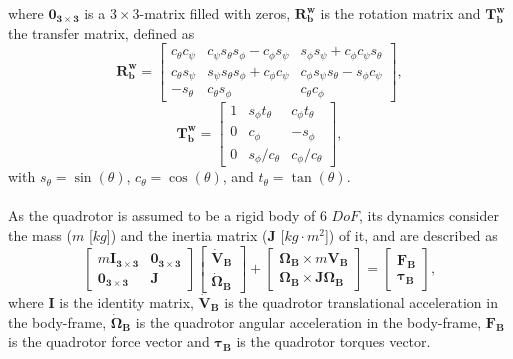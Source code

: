 where $\mathbf{0_{3\times 3}}$ is a $3\times 3$-matrix filled with zeros, $\mathbf{R_{b}^{w}}$ is the rotation matrix and $\mathbf{T_{b}^{w}}$ the transfer matrix, defined as
\begin{equation}
\mathbf{R_{b}^{w}} = \begin{bmatrix}
c_\theta c_\psi & c_\psi s_\theta s_\phi-c_\phi s_\psi & s_\phi s_\psi+c_\phi c_\psi s_\theta\\
c_\theta s_\psi & s_\psi s_\theta s_\phi+c_\phi c_\psi & c_\phi s_\psi s_\theta - s_\phi c_\psi\\
-s_\theta & c_\theta s_\phi & c_\theta c_\phi
\end{bmatrix},
\end{equation}
\begin{equation}
\mathbf{T_{b}^{w}} = \begin{bmatrix}
1 & s_\phi t_\theta & c_\phi t_\theta\\
0 & c_\phi & -s_\phi\\
0 & s_\phi / c_\theta & c_\phi / c_\theta 
\end{bmatrix},
\end{equation}
with $s_\theta = \sin(\theta)$, $c_\theta = \cos(\theta)$, and $t_\theta = \tan(\theta)$.
\\\\
As the quadrotor is assumed to be a rigid body of 6 $DoF$, its dynamics consider the mass ($m$ [$kg$]) and the inertia matrix ($\mathbf{J}$ [$kg\cdot m^{2}$]) of it, and are described as
\begin{equation}
\label{eqn:eomNewtonEuler}
\begin{bmatrix}
m\mathbf{I_{3\times3}} & \mathbf{0_{3\times 3}} \\
\mathbf{0_{3\times 3}} & \mathbf{J}
\end{bmatrix}
\begin{bmatrix}
\mathbf{\dot{V}_{B}} \\ \mathbf{\dot{\Omega}_B}
\end{bmatrix}
+ \begin{bmatrix}
\mathbf{\Omega_B} \times m\mathbf{V_{B}} \\
\mathbf{\Omega_B} \times \mathbf{J}\mathbf{\Omega_B}
\end{bmatrix}
=
\begin{bmatrix}
\mathbf{F_{B}} \\ \mathbf{\tau_{B}}
\end{bmatrix},
\end{equation}
where $\mathbf{I}$ is the identity matrix, $\mathbf{\dot{V}_{B}}$ is the quadrotor translational acceleration in the body-frame, $\mathbf{\dot{\Omega}_B}$ is the quadrotor angular acceleration in the body-frame, $\mathbf{F_{B}}$ is the quadrotor force vector and $\mathbf{\tau_{B}}$ is the quadrotor torques vector. 
